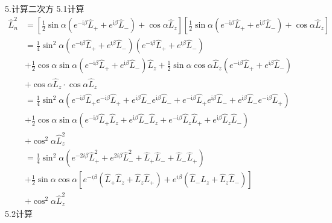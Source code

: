 5.计算二次方
5.1计算
\begin{equation}
    \begin{aligned}
        \hat{L}_{n}^{2}&=\left[ \frac{1}{2}\sin \alpha \left( e^{-\mathrm{i}\beta}\hat{L}_++e^{\mathrm{i}\beta}\hat{L}_- \right) +\cos \alpha \hat{L}_z \right] \left[ \frac{1}{2}\sin \alpha \left( e^{-\mathrm{i}\beta}\hat{L}_++e^{\mathrm{i}\beta}\hat{L}_- \right) +\cos \alpha \hat{L}_z \right] 
\\
&=\frac{1}{4}\sin ^2\alpha \left( e^{-\mathrm{i}\beta}\hat{L}_++e^{\mathrm{i}\beta}\hat{L}_- \right) \left( e^{-\mathrm{i}\beta}\hat{L}_++e^{\mathrm{i}\beta}\hat{L}_- \right) 
\\
&+\frac{1}{2}\cos \alpha \sin \alpha \left( e^{-\mathrm{i}\beta}\hat{L}_++e^{\mathrm{i}\beta}\hat{L}_- \right) \hat{L}_z+\frac{1}{2}\sin \alpha \cos \alpha \hat{L}_z\left( e^{-\mathrm{i}\beta}\hat{L}_++e^{\mathrm{i}\beta}\hat{L}_- \right) 
\\
&+\cos \alpha \hat{L}_z\cdot \cos \alpha \hat{L}_z
\\
&=\frac{1}{4}\sin ^2\alpha \left( e^{-\mathrm{i}\beta}\hat{L}_+e^{-\mathrm{i}\beta}\hat{L}_++e^{\mathrm{i}\beta}\hat{L}_-e^{\mathrm{i}\beta}\hat{L}_-+e^{-\mathrm{i}\beta}\hat{L}_+e^{\mathrm{i}\beta}\hat{L}_-+e^{\mathrm{i}\beta}\hat{L}_-e^{-\mathrm{i}\beta}\hat{L}_+ \right) 
\\
&+\frac{1}{2}\cos \alpha \sin \alpha \left( e^{-\mathrm{i}\beta}\hat{L}_+\hat{L}_z+e^{\mathrm{i}\beta}\hat{L}_-\hat{L}_z+e^{-\mathrm{i}\beta}\hat{L}_z\hat{L}_++e^{\mathrm{i}\beta}\hat{L}_z\hat{L}_- \right) 
\\
&+\cos ^2\alpha \hat{L}_{z}^{2}
\\
&=\frac{1}{4}\sin ^2\alpha \left( e^{-2i\beta}\hat{L}_{+}^{2}+e^{2i\beta}\hat{L}_{-}^{2}+\hat{L}_+\hat{L}_-+\hat{L}_-\hat{L}_+ \right) 
\\
&+\frac{1}{2}\sin \alpha \cos \alpha \left[ e^{-i\beta}\left( \hat{L}_+\hat{L}_z+\hat{L}_z\hat{L}_+ \right) +e^{i\beta}\left( \hat{L}_-\hat{L}_z+\hat{L}_z\hat{L}_- \right) \right] 
\\
&+\cos ^2\alpha \hat{L}_{z}^{2}
    \end{aligned}
\end{equation}
5.2计算
